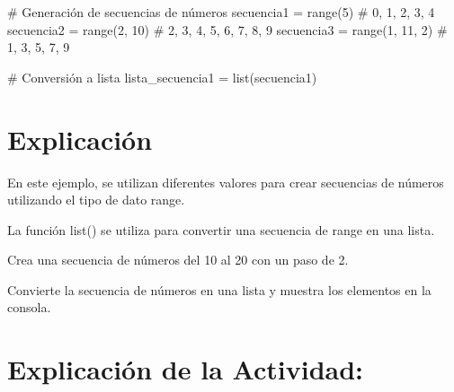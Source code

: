 \documentclass[
  a4paper,
  onepage,
  openany]{scrreprt}
\newenvironment{Shaded}{\begin{snugshade}}{\end{snugshade}}
\newcommand{\BuiltInTok}[1]{\textcolor[rgb]{0.00,0.23,0.31}{#1}}
\newcommand{\CommentTok}[1]{\textcolor[rgb]{0.37,0.37,0.37}{#1}}
\newcommand{\DecValTok}[1]{\textcolor[rgb]{0.68,0.00,0.00}{#1}}
\newcommand{\NormalTok}[1]{\textcolor[rgb]{0.00,0.23,0.31}{#1}}
\newcommand{\OperatorTok}[1]{\textcolor[rgb]{0.37,0.37,0.37}{#1}}
\begin{document}
\begin{Shaded}
\begin{Highlighting}[]
\CommentTok{\# Generación de secuencias de números}
\NormalTok{secuencia1 }\OperatorTok{=} \BuiltInTok{range}\NormalTok{(}\DecValTok{5}\NormalTok{)          }\CommentTok{\# 0, 1, 2, 3, 4}
\NormalTok{secuencia2 }\OperatorTok{=} \BuiltInTok{range}\NormalTok{(}\DecValTok{2}\NormalTok{, }\DecValTok{10}\NormalTok{)      }\CommentTok{\# 2, 3, 4, 5, 6, 7, 8, 9}
\NormalTok{secuencia3 }\OperatorTok{=} \BuiltInTok{range}\NormalTok{(}\DecValTok{1}\NormalTok{, }\DecValTok{11}\NormalTok{, }\DecValTok{2}\NormalTok{)   }\CommentTok{\# 1, 3, 5, 7, 9}

\CommentTok{\# Conversión a lista}
\NormalTok{lista\_secuencia1 }\OperatorTok{=} \BuiltInTok{list}\NormalTok{(secuencia1)}
\end{Highlighting}
\end{Shaded}

\hypertarget{explicaciuxf3n-23}{%
\section{Explicación}\label{explicaciuxf3n-23}}

En este ejemplo, se utilizan diferentes valores para crear secuencias de
números utilizando el tipo de dato range.

La función list() se utiliza para convertir una secuencia de range en
una lista.

\begin{tcolorbox}[enhanced jigsaw, breakable, opacityback=0, toptitle=1mm, coltitle=black, toprule=.15mm, rightrule=.15mm, colframe=quarto-callout-important-color-frame, opacitybacktitle=0.6, arc=.35mm, title=\textcolor{quarto-callout-important-color}{\faExclamation}\hspace{0.5em}{Actividad Práctica:}, titlerule=0mm, colbacktitle=quarto-callout-important-color!10!white, bottomtitle=1mm, bottomrule=.15mm, colback=white, left=2mm, leftrule=.75mm]

Crea una secuencia de números del 10 al 20 con un paso de 2.

Convierte la secuencia de números en una lista y muestra los elementos
en la consola.

\end{tcolorbox}

\hypertarget{explicaciuxf3n-de-la-actividad-21}{%
\section{Explicación de la
Actividad:}\label{explicaciuxf3n-de-la-actividad-21}}
\end{document}
